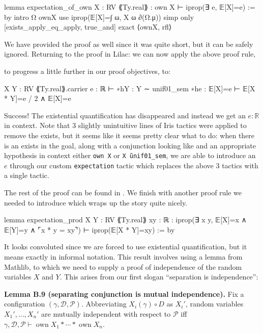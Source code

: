 \begin{leancode}
lemma expectation_of_own {X : RV ⟪Ty.real⟫} : own X ⊢ iprop(∃ e, 𝔼[X]=e) := by
  intro Ω ownX
  use iprop(𝔼[X]=∫ ω, X ω ∂(Ω.μ))
  simp only [exists_apply_eq_apply, true_and]
  exact ⟨ownX, rfl⟩
\end{leancode}

We have provided the proof as well since it was quite short, but it can be safely ignored. Returning to the proof in Lilac: we can now apply the above proof rule,


to progress a little further in our proof objectives, to:
\begin{leancode}
X Y : RV ⟪Ty.real⟫.carrier
e : ℝ
⊢ 
∗hY : Y ∼ unif01_sem
∗he : 𝔼[X]=e
⊢ 𝔼[X * Y]=e / 2 ∧ 𝔼[X]=e
\end{leancode}

Success! The existential quantification has disappeared and instead we get an $e : \mathbb{R}$ in context. Note that 3 slightly
unintuitive lines of Iris tactics were applied to remove the exists, but it seems like it seems pretty clear what to do:
when there is an exists in the goal, along with a conjunction looking like  and an appropriate hypothesis in
context either \texttt{own X} or \texttt{X \~ unif01\_sem}, we are able to introduce an $e$ through our custom \texttt{expectation} tactic which replaces the
above 3 tactics with a single tactic.

The rest of the proof can be found in . We finish with another proof rule we needed to introduce which wraps up the story quite nicely.

\begin{leancode}
lemma expectation_prod {X Y : RV ⟪Ty.real⟫} {xy : ℝ} :
    iprop(∃ x y, 𝔼[X]=x ∧ 𝔼[Y]=y ∧ ⌜x * y = xy⌝) ⊢ iprop(𝔼[X * Y]=xy) := by
\end{leancode}

It looks convoluted since we are forced to use existential quantification, but it means exactly  in informal notation.
This result involves using a lemma from Mathlib, to which we need to supply a proof of independence of the random variables $X$ and $Y$. This arises
from our first slogan ``separation is independence'':


\textbf{Lemma B.9 \citep{lilac} (separating conjunction is mutual independence).}
Fix a configuration $(\gamma, \mathcal{D}, \mathcal{P})$.
Abbreviating $X_i(\gamma) \circ D$ as $X_i'$, random variables $X_1', \ldots, X_n'$
are mutually independent with respect to $\mathcal{P}$ iff
$\gamma, \mathcal{D}, \mathcal{P} \vdash \operatorname{own} X_1 * \cdots * \operatorname{own} X_n$.

